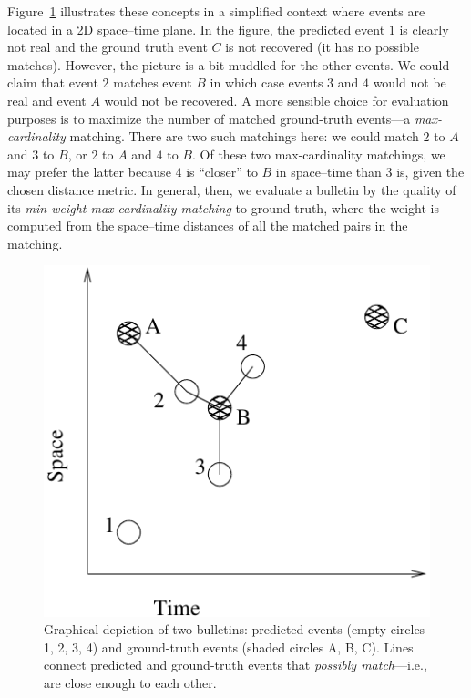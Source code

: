 \documentclass[a4paper,12pt]{article}
\begin{document}
Figure~\ref{fig-2-bulletins} illustrates these concepts in a
simplified context where events are located in a 2D space--time plane.
In the figure, the predicted event $1$ is clearly not real
and the ground truth event $C$ is not recovered (it has no possible
matches). However, the picture is
a bit muddled for the other events. We could claim that event $2$
matches event $B$ in which case events $3$ and $4$ would not be real and
event $A$ would not be recovered. A more sensible choice for
evaluation purposes is to maximize the number of matched ground-truth
events---a {\em max-cardinality} matching. There are two such
matchings here: we could match $2$ to $A$ and $3$ to $B$, or $2$ to
$A$ and $4$ to $B$. Of these two max-cardinality matchings,
we may prefer the latter because $4$ is ``closer'' to $B$ in
space--time than $3$ is, given the chosen distance metric.
In general, then, we evaluate a bulletin by the quality of
its {\em min-weight max-cardinality matching} to ground truth, where
the weight is computed from the space--time distances of all the
matched pairs in the matching.

\begin{figure}
\begin{center}
\includegraphics{visa_eval_fig1.pdf}
\end{center}
\caption{Graphical depiction of two bulletins: predicted events
  (empty circles 1, 2, 3, 4) and ground-truth events (shaded circles
  A, B, C). Lines connect predicted and ground-truth events
  that {\em possibly match}---i.e., are close enough to each other.}
\label{fig-2-bulletins}
\end{figure}
\end{document}
